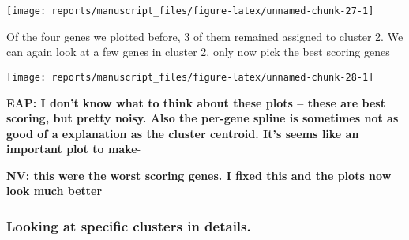 \documentclass[9pt,a4paper,]{extarticle}
\newenvironment{Shaded}{\begin{snugshade}}{\end{snugshade}}
\newcommand{\CommentTok}[1]{\textcolor[rgb]{0.56,0.35,0.01}{\textit{#1}}}
\newcommand{\DataTypeTok}[1]{\textcolor[rgb]{0.13,0.29,0.53}{#1}}
\newcommand{\DecValTok}[1]{\textcolor[rgb]{0.00,0.00,0.81}{#1}}
\newcommand{\FloatTok}[1]{\textcolor[rgb]{0.00,0.00,0.81}{#1}}
\newcommand{\KeywordTok}[1]{\textcolor[rgb]{0.13,0.29,0.53}{\textbf{#1}}}
\newcommand{\NormalTok}[1]{#1}
\newcommand{\OperatorTok}[1]{\textcolor[rgb]{0.81,0.36,0.00}{\textbf{#1}}}
\newcommand{\OtherTok}[1]{\textcolor[rgb]{0.56,0.35,0.01}{#1}}
\newcommand{\StringTok}[1]{\textcolor[rgb]{0.31,0.60,0.02}{#1}}
\begin{document}
\begin{center}\texttt{[image: reports/manuscript\_files/figure-latex/unnamed-chunk-27-1]} \end{center}

Of the four genes we plotted before, 3 of them remained assigned to cluster 2. We can again look at a
few genes in cluster 2, only now pick the best scoring genes

\begin{Shaded}
\end{Shaded}

\begin{center}\texttt{[image: reports/manuscript\_files/figure-latex/unnamed-chunk-28-1]} \end{center}

\textbf{EAP: I don't know what to think about these plots -- these are best scoring,
but pretty noisy. Also the per-gene spline is sometimes not as good of a
explanation as the cluster centroid. It's seems like an important plot to
make}-

\textbf{NV: this were the worst scoring genes. I fixed this and the plots now look
much better}

\hypertarget{looking-at-specific-clusters-in-details.}{%
\subsubsection{Looking at specific clusters in details.}\label{looking-at-specific-clusters-in-details.}}
\end{document}
